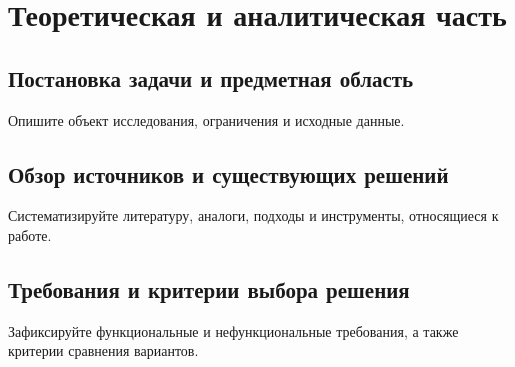 \chapter{Теоретическая и аналитическая часть}

\section{Постановка задачи и предметная область}
Опишите объект исследования, ограничения и исходные данные.

\section{Обзор источников и существующих решений}
Систематизируйте литературу, аналоги, подходы и инструменты, относящиеся к работе.

\section{Требования и критерии выбора решения}
Зафиксируйте функциональные и нефункциональные требования, а также критерии сравнения вариантов.
